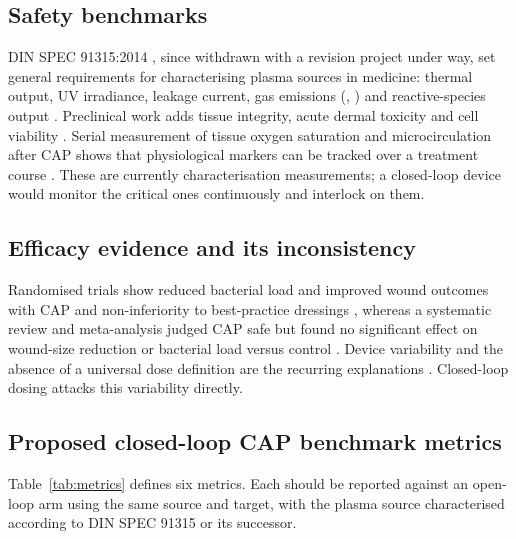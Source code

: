 \documentclass[preprint,review,12pt,authoryear]{elsarticle}
\begin{document}
\subsection{Safety benchmarks}

DIN SPEC 91315:2014 \citep{dinspec91315}, since withdrawn with a revision project under way, set general requirements for characterising plasma sources in medicine: thermal output, UV irradiance, leakage current, gas emissions (, ) and reactive-species output \citep{mann2016}. Preclinical work adds tissue integrity, acute dermal toxicity and cell viability \citep{boehm2018}. Serial measurement of tissue oxygen saturation and microcirculation after CAP shows that physiological markers can be tracked over a treatment course \citep{kisch2016a,kisch2016b}. These are currently characterisation measurements; a closed-loop device would monitor the critical ones continuously and interlock on them.

\subsection{Efficacy evidence and its inconsistency}

Randomised trials show reduced bacterial load and improved wound outcomes with CAP \citep{isbary2010,brehmer2015} and non-inferiority to best-practice dressings \citep{strohal2022}, whereas a systematic review and meta-analysis judged CAP safe but found no significant effect on wound-size reduction or bacterial load versus control \citep{assadian2019}. Device variability and the absence of a universal dose definition are the recurring explanations \citep{dai2020}. Closed-loop dosing attacks this variability directly.

\subsection{Proposed closed-loop CAP benchmark metrics}
\label{sec:metrics}

Table~\ref{tab:metrics} defines six metrics. Each should be reported against an open-loop arm using the same source and target, with the plasma source characterised according to DIN SPEC 91315 or its successor.
\end{document}
